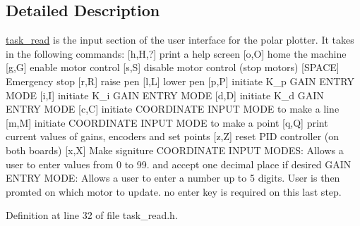 \subsection{Detailed Description}
\hyperlink{classtask__read}{task\-\_\-read} is the input section of the user interface for the polar plotter. It takes in the following commands\-: \mbox{[}h,H,?\mbox{]} print a help screen \mbox{[}o,O\mbox{]} home the machine \mbox{[}g,G\mbox{]} enable motor control \mbox{[}s,S\mbox{]} disable motor control (stop motors) \mbox{[}S\-P\-A\-C\-E\mbox{]} Emergency stop \mbox{[}r,R\mbox{]} raise pen \mbox{[}l,L\mbox{]} lower pen \mbox{[}p,P\mbox{]} initiate K\-\_\-p G\-A\-I\-N E\-N\-T\-R\-Y M\-O\-D\-E \mbox{[}i,I\mbox{]} initiate K\-\_\-i G\-A\-I\-N E\-N\-T\-R\-Y M\-O\-D\-E \mbox{[}d,D\mbox{]} initiate K\-\_\-d G\-A\-I\-N E\-N\-T\-R\-Y M\-O\-D\-E \mbox{[}c,C\mbox{]} initiate C\-O\-O\-R\-D\-I\-N\-A\-T\-E I\-N\-P\-U\-T M\-O\-D\-E to make a line \mbox{[}m,M\mbox{]} initiate C\-O\-O\-R\-D\-I\-N\-A\-T\-E I\-N\-P\-U\-T M\-O\-D\-E to make a point \mbox{[}q,Q\mbox{]} print current values of gains, encoders and set points \mbox{[}z,Z\mbox{]} reset P\-I\-D controller (on both boards) \mbox{[}x,X\mbox{]} Make signiture C\-O\-O\-R\-D\-I\-N\-A\-T\-E I\-N\-P\-U\-T M\-O\-D\-E\-S\-: Allows a user to enter values from 0 to 99. and accept one decimal place if desired G\-A\-I\-N E\-N\-T\-R\-Y M\-O\-D\-E\-: Allows a user to enter a number up to 5 digits. User is then promted on which motor to update. no enter key is required on this last step. 

Definition at line 32 of file task\-\_\-read.\-h.



